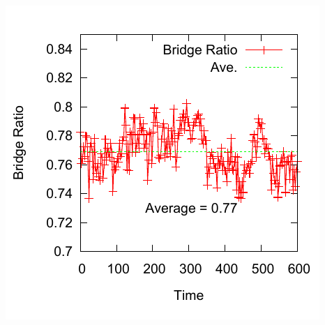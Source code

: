 \documentclass[12pt, dvipdfmx]{beamer}
\begin{document}
\begin{frame}
\begin{columns}[T, totalwidth=\linewidth]
		\includegraphics[width=\columnwidth]{./fig/AB50/B_ratio.pdf}
\end{columns}

\end{frame}
\end{document}

